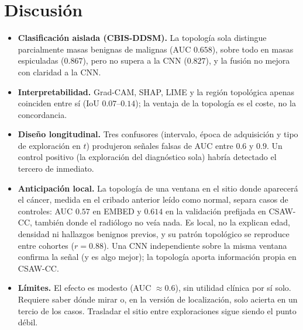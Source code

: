 \section{Discusión}
\label{sec:discusion}
\begin{itemize}
  \item \textbf{Clasificación aislada (CBIS-DDSM).} La topología sola
        distingue parcialmente masas benignas de malignas (AUC $0.658$),
        sobre todo en masas espiculadas ($0.867$), pero no supera a la CNN
        ($0.827$), y la fusión no mejora con claridad a la CNN.
  \item \textbf{Interpretabilidad.} Grad-CAM, SHAP, LIME y la región
        topológica apenas coinciden entre sí (IoU $0.07$--$0.14$); la ventaja
        de la topología es el coste, no la concordancia.
  \item \textbf{Diseño longitudinal.} Tres confusores (intervalo, época de
        adquisición y tipo de exploración en $t$) produjeron señales falsas
        de AUC entre $0.6$ y $0.9$. Un control positivo (la exploración del
        diagnóstico sola) habría detectado el tercero de inmediato.
  \item \textbf{Anticipación local.} La topología de una ventana en el sitio
        donde aparecerá el cáncer, medida en el cribado anterior leído como
        normal, separa casos de controles: AUC $0.57$ en EMBED y $0.614$ en
        la validación prefijada en CSAW-CC, también donde el radiólogo no
        veía nada. Es local, no la explican edad, densidad ni hallazgos
        benignos previos, y su patrón topológico se reproduce entre cohortes
        ($r = 0.88$). Una CNN independiente sobre la misma ventana confirma
        la señal (y es algo mejor); la topología aporta información propia
        en CSAW-CC.
  \item \textbf{Límites.} El efecto es modesto (AUC $\approx 0.6$), sin
        utilidad clínica por sí solo. Requiere saber dónde mirar o, en la
        versión de localización, solo acierta en un tercio de los casos.
        Trasladar el sitio entre exploraciones sigue siendo el punto débil.
\end{itemize}
